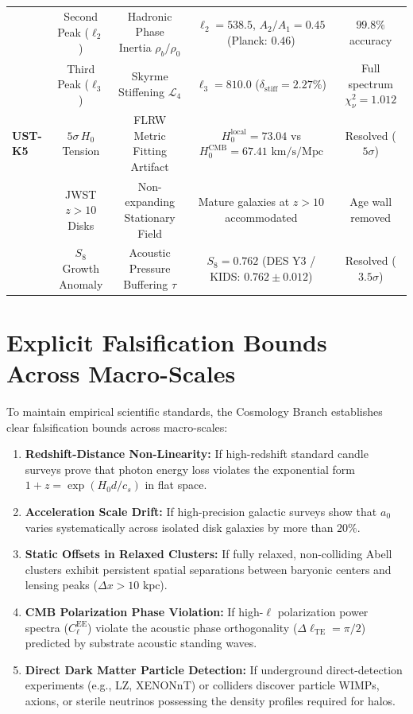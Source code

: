 \documentclass[11pt,a4paper]{article}
\begin{document}
\begin{table}[htbp]
{\begin{tabular}{lcccc}
				& Second Peak ($\ell_2$) & Hadronic Phase Inertia $\rho_b/\rho_0$ & $\ell_2 = 538.5$, $A_2/A_1 = 0.45$ (Planck: $0.46$) & $99.8\%$ accuracy \\
				& Third Peak ($\ell_3$) & Skyrme Stiffening $\mathcal{L}_4$ & $\ell_3 = 810.0$ ($\delta_{\text{stiff}} = 2.27\%$) & Full spectrum $\chi^2_\nu = 1.012$ \\
				\midrule
				\textbf{UST-K5} & $5\sigma \, H_0$ Tension & FLRW Metric Fitting Artifact & $H_0^{\text{local}} = 73.04$ vs $H_0^{\text{CMB}} = 67.41 \text{ km/s/Mpc}$ & Resolved ($5\sigma$) \\
				& JWST $z > 10$ Disks & Non-expanding Stationary Field & Mature galaxies at $z > 10$ accommodated & Age wall removed \\
				& $S_8$ Growth Anomaly & Acoustic Pressure Buffering $\tau$ & $S_8 = \mathbf{0.762}$ (DES Y3 / KIDS: $0.762 \pm 0.012$) & Resolved ($3.5\sigma$) \\
				\bottomrule
			\end{tabular}%
		}
		\label{tab:cosmology_synthesis_matrix}
	\end{table}
	
	\section{Explicit Falsification Bounds Across Macro-Scales}
	\label{sec:falsification_bounds}
	
	To maintain empirical scientific standards, the Cosmology Branch establishes clear falsification bounds across macro-scales:
	
	\begin{enumerate}
		\item \textbf{Redshift-Distance Non-Linearity:} If high-redshift standard candle surveys prove that photon energy loss violates the exponential form $1+z = \exp(H_0 d / c_s)$ in flat space.
		\item \textbf{Acceleration Scale Drift:} If high-precision galactic surveys show that $a_0$ varies systematically across isolated disk galaxies by more than $20\%$.
		\item \textbf{Static Offsets in Relaxed Clusters:} If fully relaxed, non-colliding Abell clusters exhibit persistent spatial separations between baryonic centers and lensing peaks ($\Delta x > 10 \text{ kpc}$).
		\item \textbf{CMB Polarization Phase Violation:} If high-$\ell$ polarization power spectra ($C_\ell^{\text{EE}}$) violate the acoustic phase orthogonality ($\Delta \ell_{\text{TE}} = \pi / 2$) predicted by substrate acoustic standing waves.
		\item \textbf{Direct Dark Matter Particle Detection:} If underground direct-detection experiments (e.g., LZ, XENONnT) or colliders discover particle WIMPs, axions, or sterile neutrinos possessing the density profiles required for halos.
	\end{enumerate}
	
\end{document}
